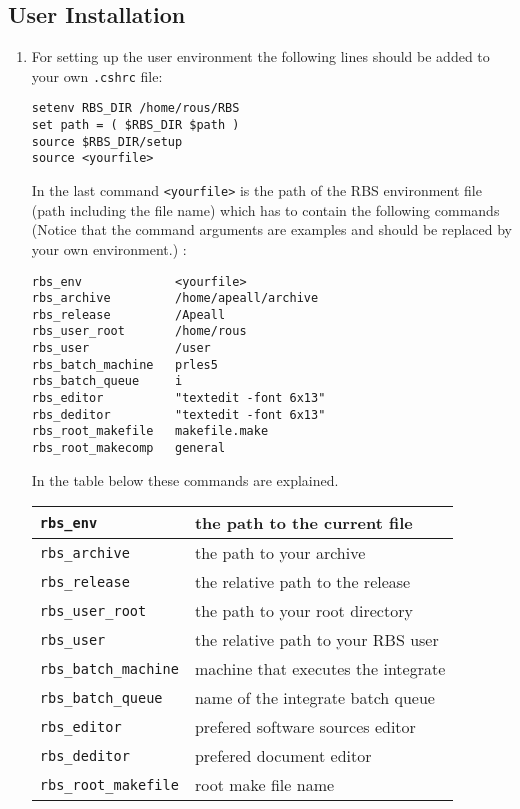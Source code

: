 \subsection{User Installation}
\begin{enumerate}
\item For setting up the user environment the following lines should be added 
to your own \verb+.cshrc+ file:
\begin{verbatim}
setenv RBS_DIR /home/rous/RBS
set path = ( $RBS_DIR $path )
source $RBS_DIR/setup
source <yourfile> 
\end{verbatim}
In the last command \verb+<yourfile>+ is the path of the RBS environment file (path including the file name) which has to contain the following commands (Notice
that the command arguments are examples and should be replaced by your own
environment.) :
\begin{verbatim}
rbs_env             <yourfile>            
rbs_archive         /home/apeall/archive  
rbs_release         /Apeall               
rbs_user_root       /home/rous            
rbs_user            /user                 
rbs_batch_machine   prles5                
rbs_batch_queue     i                     
rbs_editor          "textedit -font 6x13" 
rbs_deditor         "textedit -font 6x13" 
rbs_root_makefile   makefile.make         
rbs_root_makecomp   general               
\end{verbatim}
In the table below these commands are explained.
\begin{tabular}{|l|p{5cm}|}
\hline
\verb+rbs_env+             & the path to the current file\\ \hline
\verb+rbs_archive+         & the path to your archive\\ \hline
\verb+rbs_release+         & the relative path to the release\\ \hline
\verb+rbs_user_root+       & the path to your root directory\\ \hline
\verb+rbs_user+            & the relative path to your RBS user \\ \hline
\verb+rbs_batch_machine+   & machine that executes the integrate\\ \hline
\verb+rbs_batch_queue+     & name of the integrate batch queue\\ \hline
\verb+rbs_editor+          & prefered software sources editor\\ \hline
\verb+rbs_deditor+         & prefered document editor\\ \hline
\verb+rbs_root_makefile+   & root make file name\\ \hline

\end{tabular}
\end{enumerate}
